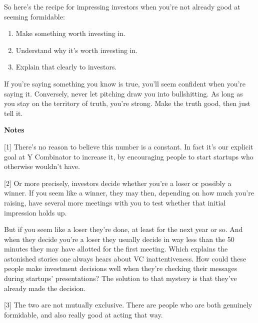 So here's the recipe for impressing investors
                  when you're not already good at seeming formidable:
                  \begin{enumerate}
\item Make something worth investing in.


\item Understand why it's worth investing in.


\item Explain that clearly to investors.
\end{enumerate}

                  If you're saying something you know is true, you'll seem
                  confident when you're saying it. Conversely, never let
                  pitching draw you into bullshitting. As long as you stay on
                  the territory of truth, you're strong. Make the truth good,
                  then just tell it.









\textbf{Notes}

[1] There's no reason to believe this number is a constant. In
                  fact it's our explicit goal at Y Combinator to increase it, by
                  encouraging people to start startups who otherwise wouldn't
                  have.

[2] Or more precisely, investors decide whether you're a loser
                  or possibly a winner. If you seem like a winner, they may
                  then, depending on how much you're raising, have several more
                  meetings with you to test whether that initial impression
                  holds up.

But if you seem like a loser they're
                  done, at least for the next year or so. And when they decide
                  you're a loser they usually decide in way less than the 50
                  minutes they may have allotted for the first meeting. Which
                  explains the astonished stories one always hears about VC
                  inattentiveness. How could these people make investment
                  decisions well when they're checking their messages during
                  startups' presentations? The solution to that mystery is that
                  they've already made the decision.

[3] The two are not mutually exclusive. There are people who
                  are both genuinely formidable, and also really good at acting
                  that way.

